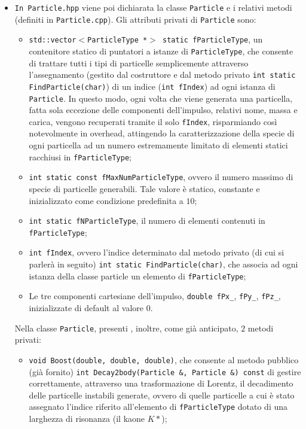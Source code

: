 \documentclass{article}
\begin{document}
\begin{itemize}
    \item \texttt{In Particle.hpp} viene poi dichiarata la classe \texttt{Particle} e i relativi metodi (definiti in \texttt{Particle.cpp}). Gli attributi privati di \texttt{Particle} sono:
    \begin{itemize}
        \item \texttt{std::vector\(<\)ParticleType *\(>\) static fParticleType}, un contenitore statico di puntatori a istanze di \texttt{ParticleType}, che consente di trattare  tutti i tipi di particelle semplicemente attraverso l'assegnamento (gestito dal costruttore e dal metodo privato \texttt{int static FindParticle(char)}) di un indice (\texttt{int fIndex}) ad ogni istanza di \texttt{Particle}. In questo modo, ogni volta che viene generata una particella, fatta sola eccezione delle componenti dell'impulso, relativi nome, massa e carica, vengono recuperati tramite il solo \texttt{fIndex}, risparmiando così notevolmente in overhead, attingendo la caratterizzazione della specie di ogni particella ad un numero estremamente limitato di elementi statici racchiusi in \texttt{fParticleType};
        \item \texttt{int static const fMaxNumParticleType}, ovvero il numero massimo di specie di particelle generabili. Tale valore è statico, constante e inizializzato come condizione predefinita a \(10\);
        \item \texttt{int static fNParticleType}, il numero di elementi contenuti in \texttt{fParticleType};
        \item \texttt{int fIndex}, ovvero l'indice determinato dal metodo privato (di cui si parlerà in seguito) \texttt{int static FindParticle(char)}, che associa ad ogni istanza della classe particle un elemento di \texttt{fParticleType};
        \item Le tre componenti cartesiane dell'impulso, \texttt{double fPx\_}, \texttt{fPy\_}, \texttt{fPz\_}, inizializzate di default al valore \(0\).
    \end{itemize}
    Nella classe \texttt{Particle}, presenti , inoltre, come già anticipato, \(2\) metodi privati:
    \begin{itemize}
        \item \texttt{void Boost(double, double, double)}, che consente al metodo pubblico (già fornito) \texttt{int Decay2body(Particle \&, Particle \&) const} di gestire correttamente, attraverso una trasformazione di Lorentz, il decadimento delle particelle instabili generate, ovvero di quelle particelle a cui è stato assegnato l'indice riferito all'elemento di \texttt{fParticleType} dotato di una larghezza di risonanza (il kaone \(K*\));

\end{itemize}
\end{itemize}
\end{document}
